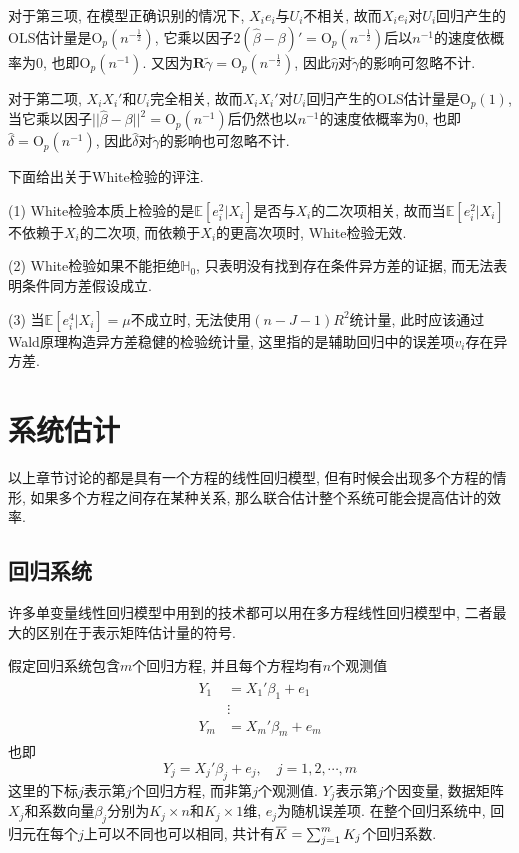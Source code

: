 \documentclass[cn, 12pt, math=mtpro2, bibstyle=apa, blue, twocol]{elegantbook}
\newcommand{\RH}{\mathbold{R}}
\newcommand{\E}{\mathbb{E}}
\newcommand{\hb}{\hat{\beta}}
\newcommand{\HH}{\mathbb{H}}
\newcommand{\overbar}[1]{\mkern 1.5mu\overline{\mkern-1.5mu#1\mkern-1.5mu}\mkern 1.5mu}
\begin{document}
对于第三项, 在模型正确识别的情况下, $X_ie_i$与$U_i$不相关, 故而$X_ie_i$对$U_i$回归产生的OLS估计量是$\text{O}_p(n^{-\frac{1}{2}})$, 它乘以因子$2(\hb-\beta)'=\text{O}_p(n^{-\frac{1}{2}})$后以$n^{-1}$的速度依概率为0, 也即$\text{O}_p(n^{-1})$. 又因为$\RH\tilde{\gamma}=\text{O}_p(n^{-\frac{1}{2}})$, 因此$\hat{\eta}$对$\tilde{\gamma}$的影响可忽略不计.

对于第二项, $X_iX_i'$和$U_i$完全相关, 故而$X_iX_i'$对$U_i$回归产生的OLS估计量是$\text{O}_p(1)$, 当它乘以因子$||\hb-\beta||^2=\text{O}_p(n^{-1})$后仍然也以$n^{-1}$的速度依概率为0, 也即$\hat{\delta}=\text{O}_p(n^{-1})$, 因此$\hat{\delta}$对$\tilde{\gamma}$的影响也可忽略不计.

\begin{remark}
下面给出关于White检验的评注.

(1) White检验本质上检验的是$\E[e_i^2|X_i]$是否与$X_i$的二次项相关, 故而当$\E[e_i^2|X_i]$不依赖于$X_i$的二次项, 而依赖于$X_i$的更高次项时, White检验无效.

(2) White检验如果不能拒绝$\HH_0$, 只表明没有找到存在条件异方差的证据, 而无法表明条件同方差假设成立.

(3) 当$\E[e_i^4|X_i]=\mu$不成立时, 无法使用$(n-J-1)R^2$统计量, 此时应该通过Wald原理构造异方差稳健的检验统计量, 这里指的是辅助回归中的误差项$v_i$存在异方差.
\end{remark}

\chapter{系统估计}
以上章节讨论的都是具有一个方程的线性回归模型, 但有时候会出现多个方程的情形, 如果多个方程之间存在某种关系, 那么联合估计整个系统可能会提高估计的效率.
\section{回归系统}
许多单变量线性回归模型中用到的技术都可以用在多方程线性回归模型中, 二者最大的区别在于表示矩阵估计量的符号.

假定回归系统包含$m$个回归方程, 并且每个方程均有$n$个观测值
\begin{align}
  \begin{split}
  Y_1&=X_1'\beta_1+e_1 \\
  &\vdots \\
  Y_m&=X_m'\beta_m+e_m
  \end{split}
  \label{eq5.1}
\end{align}
也即
$$Y_j=X_j'\beta_j+e_j,\quad j=1,2,\cdots,m$$
这里的下标$j$表示第$j$个回归方程, 而非第$j$个观测值. $Y_j$表示第$j$个因变量, 数据矩阵$X_j$和系数向量$\beta_j$分别为$K_j\times n$和$K_j\times1$维, $e_j$为随机误差项. 在整个回归系统中, 回归元在每个$j$上可以不同也可以相同, 共计有$\overbar{K}=\sum_{j=1}^{m}K_j$个回归系数.
\end{document}

